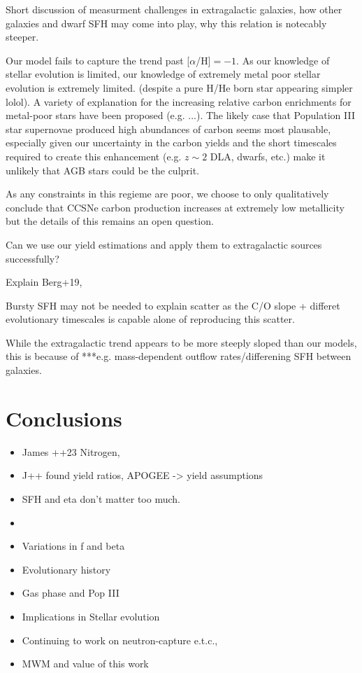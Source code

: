 \documentclass[12pt,oneside]{report}
\begin{document}
Short discussion of measurment challenges in extragalactic galaxies, how other galaxies and dwarf SFH may come into play, why this relation is notecably steeper.

Our model fails to capture the trend past [$\alpha$/H]$=-1$. As our knowledge
of stellar evolution is limited, our knowledge of extremely metal poor stellar
evolution is extremely limited. (despite a pure H/He born star appearing
simpler lolol). A variety of explanation for the increasing relative carbon
enrichments for metal-poor stars have been proposed (e.g. ...). The likely case
that Population III star supernovae produced high abundances of carbon seems
most plausable, especially given our uncertainty in the carbon yields and the
short timescales required to create this enhancement (e.g. $z\sim 2$ DLA,
dwarfs, etc.) make it unlikely that AGB stars could be the culprit. 

As any constraints in this regieme are poor, we choose to only qualitatively
conclude that CCSNe carbon production increases at extremely low metallicity
but the details of this remains an open question.


Can we use our yield estimations and apply them to extragalactic sources successfully? 

Explain Berg+19,

Bursty SFH may not be needed to explain scatter as the C/O slope + differet evolutionary timescales is capable alone of reproducing this scatter.

While the extragalactic trend appears to be more steeply sloped than our models, this is because of ***e.g. mass-dependent outflow rates/differening SFH between galaxies. 


\chapter{Conclusions}

\begin{itemize}
    \item James ++23 Nitrogen,
    \item J++ found yield ratios, APOGEE -> yield assumptions
    \item SFH and eta don't matter too much.

        \item
        \item Variations in f and beta
        \item Evolutionary history
        \item Gas phase and Pop III
        \item Implications in Stellar evolution
        \item Continuing to work on neutron-capture e.t.c., 
        \item MWM and value of this work
\end{itemize}
\end{document}
